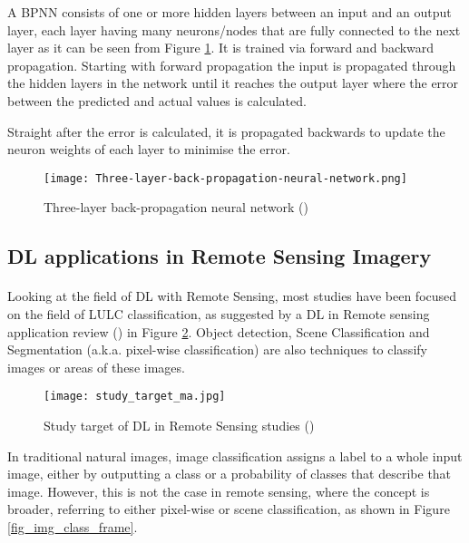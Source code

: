 A \gls{BPNN} consists of one or more hidden layers between an input and an output layer, each layer having many neurons/nodes that are fully connected to the next layer as it can be seen from Figure \ref{fig_bpnn}. It is trained via forward and backward propagation. Starting with forward propagation the input is propagated through the hidden layers in the network until it reaches the output layer where the error between the predicted and actual values is calculated. 

Straight after the error is calculated, it is propagated backwards to update the neuron weights of each layer to minimise the error.

    \begin{figure}[hbt!]
        \centering
        \texttt{[image: Three-layer-back-propagation-neural-network.png]}
        \caption{Three-layer back-propagation neural network (\cite{NNpic})}
        \label{fig_bpnn}
    \end{figure}

\subsection{\gls{DL} applications in Remote Sensing Imagery} \label{dl_rs}
\paragraph{}
Looking at the field of \gls{DL} with Remote Sensing, most studies have been focused on the field of \gls{LULC} classification, as suggested by a \gls{DL} in Remote sensing application review (\cite{MA2019166}) in Figure \ref{fig_dl_studies}. Object detection, Scene Classification and Segmentation (\gls{a.k.a.} pixel-wise classification) are also techniques to classify images or areas of these images.

    \begin{figure}[hbt!]
        \centering
        \texttt{[image: study\_target\_ma.jpg]}
        \caption{Study target of \gls{DL} in Remote Sensing studies (\cite{MA2019166})}
        \label{fig_dl_studies}
    \end{figure}

In traditional natural images, image classification assigns a label to a whole input image, either by outputting a class or a probability of classes that describe that image. However, this is not the case in remote sensing, where the concept is broader, referring to either pixel-wise or scene classification, as shown in Figure \ref{fig_img_class_frame}.

